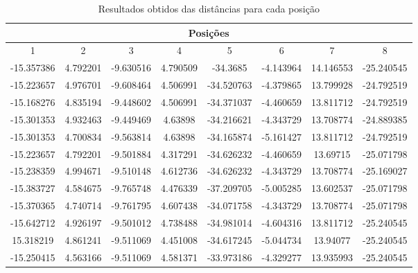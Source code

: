 \begin{table}[!htb]
\begin{center}
\begin{tabular} { c c c c c c c c }

\hline
 \multicolumn{8}{c}{ Posições }\\
\hline
1 & 2 & 3 & 4 & 5 & 6 & 7 & 8 \\
\hline
 -15.357386 & 4.792201 &-9.630516 & 4.790509 & -34.3685 & -4.143964 & 14.146553 & -25.240545 \\
 -15.223657 & 4.976701 & -9.608464 & 4.506991 & -34.520763 & -4.379865 & 13.799928 & -24.792519 \\
 -15.168276 & 4.835194 & -9.448602 & 4.506991 & -34.371037 & -4.460659 & 13.811712 & -24.792519 \\
 -15.301353 & 4.932463 & -9.449469 & 4.63898 & -34.216621 & -4.343729 & 13.708774 & -24.889385\\
 -15.301353 & 4.700834 & -9.563814 & 4.63898 & -34.165874 & -5.161427 & 13.811712 & -24.792519\\
 -15.223657 & 4.792201 & -9.501884 & 4.317291 & -34.626232 & -4.460659 & 13.69715 & -25.071798\\
 -15.238359 & 4.994671 & -9.510148 & 4.612736 & -34.626232 & -4.343729 & 13.708774 & -25.169027\\
 -15.383727 & 4.584675 & -9.765748 & 4.476339 & -37.209705 & -5.005285 & 13.602537 & -25.071798\\
 -15.370365 & 4.740714 & -9.761795 & 4.607438 & -34.071758 & -4.343729 & 13.708774 & -25.071798\\
 -15.642712 & 4.926197 & -9.501012 & 4.738488 & -34.981014 & -4.604316 & 13.811712 & -25.240545\\
15.318219 & 4.861241 & -9.511069 & 4.451008 & -34.617245 & -5.044734 & 13.94077 & -25.240545\\
-15.250415 & 4.563166 & -9.511069 & 4.581371 & -33.973186 & -4.329277 & 13.935993 & -25.240545\\

\hline
\end{tabular}
	\caption{Resultados obtidos das distâncias para cada posição}
	\label{res:exp_res_obtidos_ang}
\end{center}
\end{table}



